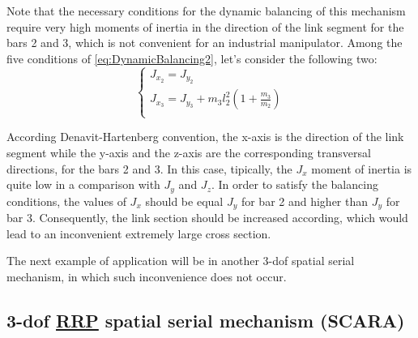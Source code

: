 \documentclass[a4paper,11pt,brazil,fleqn]{article}
\begin{document}
Note that the necessary conditions for the dynamic balancing of this mechanism require very high moments of inertia in the direction of the link segment for the bars 2 and 3, which is not convenient for an industrial manipulator. Among the five conditions of \eqref{eq:DynamicBalancing2}, let's consider the following two:
\begin{equation}\label{eq:DynamicBalancing2_}
\begin{cases}
J_{x_2} = J_{y_2} \\
J_{x_3} = J_{y_3} + m_3 l_2^2 ( 1 + \frac{m_3}{m_2} )\\
\end{cases}
\end{equation}

According Denavit-Hartenberg convention, the x-axis is the direction of the link segment while the y-axis and the z-axis are the corresponding transversal directions, for the bars 2 and 3. In this case, tipically, the $J_x$ moment of inertia is quite low in a comparison with $J_y$ and $J_z$. In order to satisfy the balancing conditions, the values of $J_x$ should be equal $J_y$ for bar 2 and  higher than $J_y$ for bar 3. Consequently, the link section should be increased according, which would lead to an inconvenient extremely large cross section.


The next example of application will be in another 3-dof spatial serial mechanism, in which such inconvenience does not occur.

\subsection{3-dof \underline{RRP} spatial serial mechanism (SCARA)} \label{S03-2}
\end{document}

